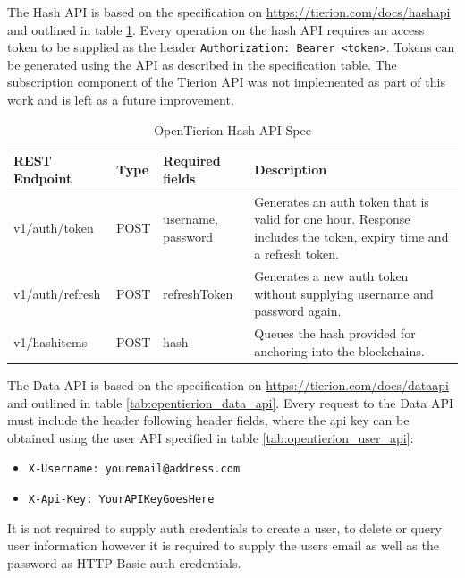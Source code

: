 \documentclass[12pt,msc,a4paper,oneside]{ucl_thesis}
\begin{document}
The Hash API is based on the specification on \url{https://tierion.com/docs/hashapi} and outlined in table \ref{tab:opentierion_hash_api}. Every operation on the hash API requires an access token to be supplied as the header \texttt{Authorization: Bearer <token>}. Tokens can be generated using the API as described in the specification table. The subscription component of the Tierion API was not implemented as part of this work and is left as a future improvement.
\begin{table}[!htbp]
    \begin{tabularx}{\textwidth}{| l l l X |}
        \hline
        \textbf{REST Endpoint} & \textbf{Type} & \textbf{Required fields} & \textbf{Description} \\
        \hline
        v1/auth/token & POST & username, password & Generates an auth token that is valid for one hour. Response includes the token, expiry time and a refresh token. \\

        v1/auth/refresh & POST & refreshToken & Generates a new auth token without supplying username and password again. \\

        v1/hashitems & POST & hash & Queues the hash provided for anchoring into the blockchains. \\
        \hline
    \end{tabularx}
    \caption{OpenTierion Hash API Spec}
    \label{tab:opentierion_hash_api}
\end{table}

The Data API is based on the specification on \url{https://tierion.com/docs/dataapi} and outlined in table \ref{tab:opentierion_data_api}. Every request to the Data API must include the header following header fields, where the api key can be obtained using the user API specified in table \ref{tab:opentierion_user_api}:
\begin{itemize}
    \item\texttt{X-Username: youremail@address.com}
    \item\texttt{X-Api-Key: YourAPIKeyGoesHere}
\end{itemize}
It is not required to supply auth credentials to create a user, to delete or query user information however it is required to supply the users email as well as the password as HTTP Basic auth credentials.
\end{document}
